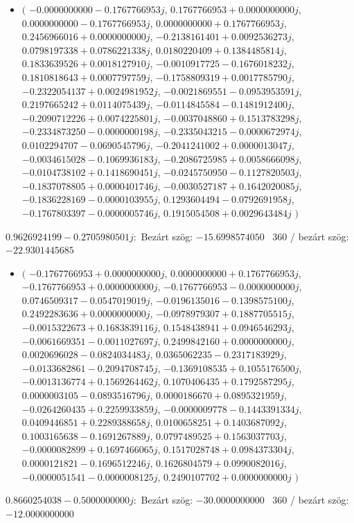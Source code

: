 \documentclass[14pt,a4paper]{article}
\begin{document}
\begin{itemize}
\item
$\big($
$-0.0000000000-0.1767766953j$, $0.1767766953+0.0000000000j$, $0.0000000000-0.1767766953j$, $0.0000000000+0.1767766953j$, $0.2456966016+0.0000000000j$, $-0.2138161401+0.0092536273j$, $0.0798197338+0.0786221338j$, $0.0180220409+0.1384485814j$, $0.1833639526+0.0018127910j$, $-0.0010917725-0.1676018232j$, $0.1810818643+0.0007797759j$, $-0.1758809319+0.0017785790j$, $-0.2322054137+0.0024981952j$, $-0.0021869551-0.0953953591j$, $0.2197665242+0.0114075439j$, $-0.0114845584-0.1481912400j$, $-0.2090712226+0.0074225801j$, $-0.0037048860+0.1513783298j$, $-0.2334873250-0.0000000198j$, $-0.2335043215-0.0000672974j$, $0.0102294707-0.0690545796j$, $-0.2041241002+0.0000013047j$, $-0.0034615028-0.1069936183j$, $-0.2086725985+0.0058666098j$, $-0.0104738102+0.1418690451j$, $-0.0245750950-0.1127820503j$, $-0.1837078805+0.0000401746j$, $-0.0030527187+0.1642020085j$, $-0.1836228169-0.0000103955j$, $0.1293604494-0.0792691958j$, $-0.1767803397-0.0000005746j$, $0.1915054508+0.0029643484j$
$\big)$
\end{itemize}
$0.9626924199-0.2705980501j$:\
Bezárt szög: $-15.6998574050$ \
360 / bezárt szög: $-22.9301445685$\
\begin{itemize}
\item
$\big($
$-0.1767766953+0.0000000000j$, $0.0000000000+0.1767766953j$, $-0.1767766953+0.0000000000j$, $-0.1767766953-0.0000000000j$, $0.0746509317-0.0547019019j$, $-0.0196135016-0.1398575100j$, $0.2492283636+0.0000000000j$, $-0.0978979307+0.1887705515j$, $-0.0015322673+0.1683839116j$, $0.1548438941+0.0946546293j$, $-0.0061669351-0.0011027697j$, $0.2499842160+0.0000000000j$, $0.0020696028-0.0824034483j$, $0.0365062235-0.2317183929j$, $-0.0133682861-0.2094708745j$, $-0.1369108535+0.1055176500j$, $-0.0013136774+0.1569264462j$, $0.1070406435+0.1792587295j$, $0.0000003105-0.0893516796j$, $0.0000186670+0.0895321959j$, $-0.0264260435+0.2259933859j$, $-0.0000009778-0.1443391334j$, $0.0409446851+0.2289388658j$, $0.0100658251+0.1403687092j$, $0.1003165638-0.1691267889j$, $0.0797489525+0.1563037703j$, $-0.0000082899+0.1697466065j$, $0.1517028748+0.0984373304j$, $0.0000121821-0.1696512246j$, $0.1626804579+0.0990082016j$, $-0.0000051541-0.0000008125j$, $0.2490107702+0.0000000000j$
$\big)$
\end{itemize}
$0.8660254038-0.5000000000j$:\
Bezárt szög: $-30.0000000000$ \
360 / bezárt szög: $-12.0000000000$\
\end{document}
